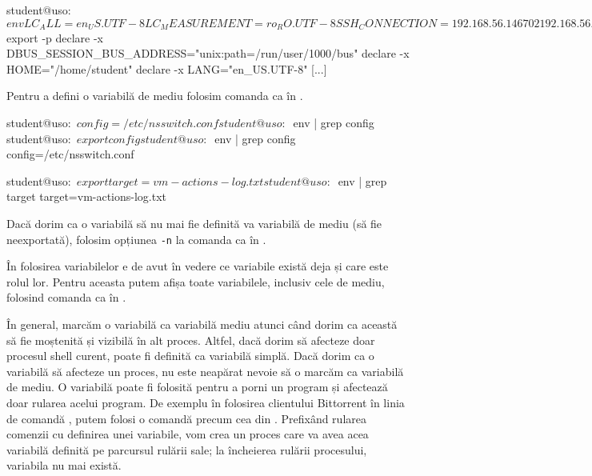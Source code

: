 \begin{screen}[caption={Afișarea variabilelor de mediu},label={lst:cli:print-env-vars}]
student@uso:~$ env
LC_ALL=en_US.UTF-8
LC_MEASUREMENT=ro_RO.UTF-8
SSH_CONNECTION=192.168.56.1 46702 192.168.56.101 22
[...]

student@uso:~$ export -p
declare -x DBUS_SESSION_BUS_ADDRESS="unix:path=/run/user/1000/bus"
declare -x HOME="/home/student"
declare -x LANG="en_US.UTF-8"
[...]
\end{screen}

Pentru a defini o variabilă de mediu folosim comanda  ca în .

\begin{screen}[caption={Definirea unei variabile de mediu},label={lst:cli:export}]
student@uso:~$ config=/etc/nsswitch.conf
student@uso:~$ env | grep config
student@uso:~$ export config
student@uso:~$ env | grep config
config=/etc/nsswitch.conf

student@uso:~$ export target=vm-actions-log.txt
student@uso:~$ env | grep target
target=vm-actions-log.txt
\end{screen}

Dacă dorim ca o variabilă să nu mai fie definită va variabilă de mediu (să fie
neexportată), folosim opțiunea \texttt{-n} la comanda  ca în .


În folosirea variabilelor e de avut în vedere ce variabile există deja și care este rolul lor. Pentru aceasta putem afișa toate variabilele, inclusiv cele de mediu, folosind comanda  ca în .

În general, marcăm o variabilă ca variabilă mediu atunci când dorim ca această să fie moștenită și vizibilă în alt proces. Altfel, dacă dorim să afecteze doar procesul shell curent, poate fi definită ca variabilă simplă. Dacă dorim ca o variabilă să afecteze un proces, nu este neapărat nevoie să o marcăm ca variabilă de mediu. O variabilă poate fi folosită pentru a porni un program și afectează doar rularea acelui program. De exemplu în folosirea clientului Bittorrent în linia
de comandă , putem folosi o comandă precum cea din . Prefixând rularea comenzii cu definirea unei variabile, vom crea un proces care va avea acea variabilă definită pe parcursul rulării sale; la încheierea rulării procesului, variabila nu mai există.

